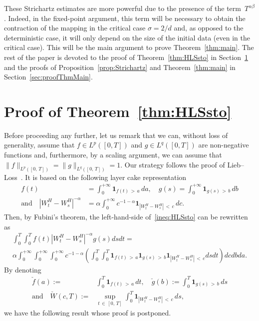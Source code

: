 \documentclass[AHL,Unicode,longabstracts,published]{cedram}
\newcommand{\bfun}{\mathbf{1}}
\begin{document}
These Strichartz estimates are more powerful due to the presence of the term~$T^{\alpha\beta}$. Indeed, in the fixed-point argument, this term will be necessary to obtain the contraction of the mapping in the critical case $\sigma = 2/d$ and, as opposed to the deterministic case, it will only depend on the size of the initial data (even in the critical case). This will be the main argument to prove Theorem~\ref{thm:main}. The rest of the paper is devoted to the proof of Theorem~\ref{thm:HLSsto} in Section~\ref{sec:proofThmHLSsto} and the proofs of Proposition~\ref{prop:Strichartz} and Theorem~\ref{thm:main} in Section~\ref{sec:proofThmMain}.

\section{Proof of Theorem~\ref{thm:HLSsto}}\label{sec:proofThmHLSsto}

Before proceeding any further, let us remark that we can, without loss of generality, assume that $f\in L^p([0,T])$ and $g\in L^q([0,T])$ are non-negative functions and, furthermore, by a scaling argument, we can assume that $\|f\|_{L^p([0,\,T])} = \|g\|_{L^q([0,\,T])} = 1$. Our strategy follows the proof of Lieb--Loss~\cite[Section~4.3]{lieb2001analysis}. It is based on the following layer cake representation
\begin{align*}
f(t) &= \int_0^{+\infty} \bfun_{f(t)\,>\,a}\,da,\quad g(s) = \int_0^{+\infty} \bfun_{g(s)\,>\,b}\,db
\\ \text{and}\quad \left|W_t^H-W_s^H\right|^{-\alpha} &= \alpha \int_0^{+\infty} c^{-1-\alpha} \bfun_{\left|W_t^H-W_s^H\right|\,<\,c}\,dc.
\end{align*}
Then, by Fubini's theorem, the left-hand-side of~\eqref{ineq:HLSsto} can be rewritten as
\begin{multline}\label{eq:ineqHLScake}
\int_0^T\int_0^T f(t)\left|W_t^H-W_s^H\right|^{-\alpha}g(s) ds dt =\\
\alpha\int_0^{+\infty}\int_0^{+\infty}\int_0^{+\infty} c^{-1-\alpha} \left(\int_0^T\int_0^T \bfun_{f(t)\,>\,a}\bfun_{g(s)\,>\,b}\bfun_{\left|W_t^H-W_s^H\right|\,<\,c} ds dt\right) dc db da.
\end{multline}
By denoting
\begin{align*}
\check{f}(a) :=& \int_0^T \bfun_{f(t)\,>\,a}\,dt,\quad\check{g}(b) := \int_0^T \bfun_{g(s)\,>\,b}\,ds\\
\text{and}\quad \check{W}(c,T) :=& \sup_{t\,\in\,[0,\,T]} \int_0^T \bfun_{\left|W_t^H-W_s^H\right|\,<\,c}\,ds,
\end{align*}
we have the following result whose proof is postponed.
\end{document}
